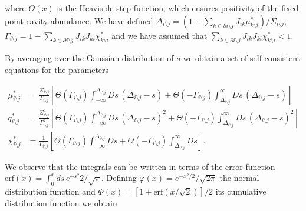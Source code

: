 \documentclass[
    preprint,
    linenumbers,
    amsmath,amssymb,amsfonts,
    aps, physrev,
    superscriptaddress,
    10pt,
    bibnotes
    ]{revtex4-2}
\newcommand{\erf}{\text{erf}}
\begin{document}
where $\Theta(x)$ is the Heaviside step function, which ensures positivity
of the fixed-point cavity abundance. We have defined $\Delta_{i\setminus j}=(1+\sum_{k\in\partial i \setminus j}J_{ik}\mu_{k \setminus i}^{*})/\Sigma_{i\setminus j}$, $\Gamma_{i\setminus j}=1-\sum_{k\in\partial i \setminus j}J_{ik}J_{ki}\chi_{k \setminus i}^{*}$ and we have assumed that $\sum_{k\in\partial i \setminus j}J_{ik}J_{ki}\chi_{k \setminus i}^{*}<1$.

By averaging over the Gaussian distribution of $s$ we obtain a set of self-consistent equations for the parameters

\begin{subequations}
\begin{align}
\mu_{i\setminus j}^*&=\frac{\Sigma_{i\setminus j}}{\Gamma_{i\setminus j}}\left[\Theta(\Gamma_{i\setminus j})\int_{-\infty}^{\Delta_{i\setminus j}}Ds\,(\Delta_{i\setminus j}-s)+\Theta(-\Gamma_{i\setminus j})\int_{\Delta_{i\setminus j}}^{\infty}Ds\,(\Delta_{i\setminus j}-s)\right]\\
q_{i\setminus j}^*&=\frac{\Sigma^2_{i\setminus j}}{\Gamma^2_{i\setminus j}}\left[\Theta(\Gamma_{i\setminus j})\int_{-\infty}^{\Delta_{i\setminus j}}Ds\,(\Delta_{i\setminus j}-s)^2+\Theta(-\Gamma_{i\setminus j})\int_{\Delta_{i\setminus j}}^{\infty}Ds\,(\Delta_{i\setminus j}-s)^2\right]\\
\chi_{i\setminus j}^*&=\frac{1}{\Gamma_{i\setminus j}}\left[\Theta(\Gamma_{i\setminus j})\int_{-\infty}^{\Delta_{i\setminus j}}Ds+\Theta(-\Gamma_{i\setminus j})\int_{\Delta_{i\setminus j}}^{\infty}Ds\right].
\end{align}
\end{subequations}

We observe that the integrals can be written in terms of the error function $\erf(x)=\int_0^{x} ds\,e^{-s^2}2/\sqrt{\pi}$. Defining $\varphi(x)=e^{-x^2/2}/\sqrt{2\pi}$ the normal distribution function and $\Phi(x)=[1+\erf(x/\sqrt{2})]/2$ its cumulative distribution function we obtain
\end{document}
